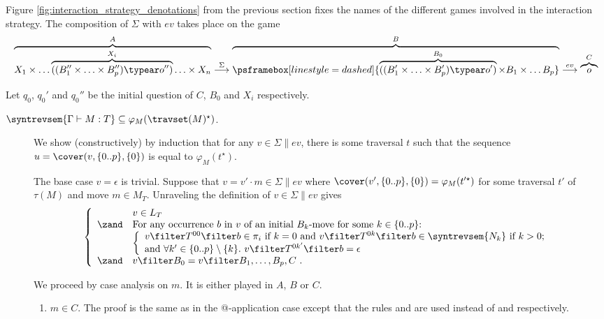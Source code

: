 \begin{itemize}[$\bullet$]
    Figure \ref{fig:interaction_strategy_denotations} from the previous section fixes the names of the different games involved in the interaction strategy.
    The composition of $\Sigma$ with $ev$ takes place on the game
    $$ \overbrace{X_1 \times \ldots \overbrace{((B_1'' \times \ldots \times B_p'') \typear o'')}^{X_i} \ldots \times X_n}^A \stackrel\Sigma\longrightarrow \overbrace{\psframebox[linestyle=dashed]{ \overbrace{((B_1' \times \ldots \times B_p') \typear o')}^{B_0} \times B_1 \times \ldots B_p }}^B \stackrel{ev}\longrightarrow \overbrace{o}^C$$

    Let $q_0$, $q_0'$ and $q_0''$ be the initial
    question of $C$, $B_0$ and $X_i$ respectively.
    \begin{description}
        \item[$\syntrevsem{\Gamma \vdash M : T} \subseteq \varphi_{M}( \travset(M)^\star )$.] We show (constructively) by induction that for any $v \in \Sigma \| ev$, there is some traversal $t$ such that
        the sequence $u = \cover(v, \{0..p\}, \{0\})$ is equal to $\varphi_M(t^\star)$.

    The base case $v=\epsilon$ is trivial. Suppose that $v = v' \cdot m \in  \Sigma   \| ev$  where $\cover(v', \{0..p\}, \{0\}) = \varphi_M(t'^\star)$ for some traversal $t'$ of $\tau(M)$ and move $m \in M_T$. Unraveling the definition of $v \in \Sigma \| ev$ gives
    \begin{equation}
    \left\{
    \begin{array}{ll}
              & v \in L_T \\
        \zand & \hbox{For any occurrence $b$ in $v$ of an initial $B_k$-move for some $k \in \{0..p\}$:} \\
        & \left\{\begin{array}{ll}
            v \filter T^{00} \filter b  \in \pi_i \hbox{ if $k=0$ and } v \filter T^{0k} \filter b  \in \syntrevsem{N_k} \hbox{ if $k>0$;} \\
            \hbox{and } \forall k'\in \{0..p\}\setminus\{k\} .\ v \filter T^{0k'} \filter b  = \epsilon
        \end{array}
        \right. \\
        \zand & v \filter B_0 = v \filter B_1, \ldots, B_p, C \ .
    \end{array}
    \right.
    \label{eqn:u_in_varapp_intersem}
    \end{equation}



    We proceed by case analysis on $m$. It is either played in $A$, $B$ or $C$.
        \begin{enumerate}[1.]
            \item $m\in C$. The proof is the same as in the @-application case except that the rules  and  are used instead of  and  respectively.


\end{enumerate}
\end{description}
\end{itemize}
